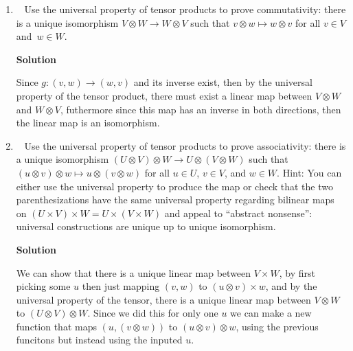 \documentclass[11pt]{article}
\newcommand\score[1]{\marginpar{\vspace{-2ex}\color{blue}{#1/3}}\hspace{-1ex}}
\newcommand\0{\mathbf{0}}
\newcommand\RR{\mathbb{R}}
\newcommand\<{\langle}
\renewcommand\>{\rangle}
\begin{document}
\begin{enumerate}
Therefore the space of stochastic matrices is bounded and closed, and since the vector space is $\RR^{n\times n}$, this implies
that the space is compact.

\item\ \score{}%
Use the universal property of tensor products to prove commutativity:
there is a unique isomorphism $V \otimes W \to W \otimes V$ such that
$v \otimes w \mapsto w \otimes v$ for all $v \in V$ and~$w \in W$.

\textbf{Solution}


Since $g: (v,w) \rightarrow (w,v)$ and its inverse exist, then by the universal property 
of the tensor product, there must exist a linear map between $V\otimes W$ and $W\otimes V$, futhermore 
since this map has an inverse in both directions, then the linear map is an isomorphism.

\item\ \score{}%
Use the universal property of tensor products to prove associativity:
there is a unique isomorphism $(U \otimes V) \otimes W \to U \otimes
(V \otimes W)$ such that $(u \otimes v) \otimes w \mapsto u \otimes (v
\otimes w)$ for all $u \in U$, $v \in V$, and $w \in W$.  Hint: You
can either use the universal property to produce the map or check that
the two parenthesizations have the same universal property regarding
bilinear maps on $(U \times V) \times W = U \times (V \times W)$ and
appeal to ``abstract nonsense'': universal constructions are unique up
to unique isomorphism.


\textbf{Solution}

We can show that there is a unique linear map between $V\times W$, by first picking some $u$ then 
just mapping $(v,w)$ to $(u\otimes v)\times w$, and by the universal property of the tensor, there is a unique linear map 
between $V\otimes W$ to $(U\otimes V)\otimes W$. Since we did this for only one $u$ we can make a new function that 
maps $(u,(v\otimes w))$ to $(u\otimes v)\otimes w$, using the previous funcitons but instead using the inputed $u$.


\end{enumerate}
\end{document}
